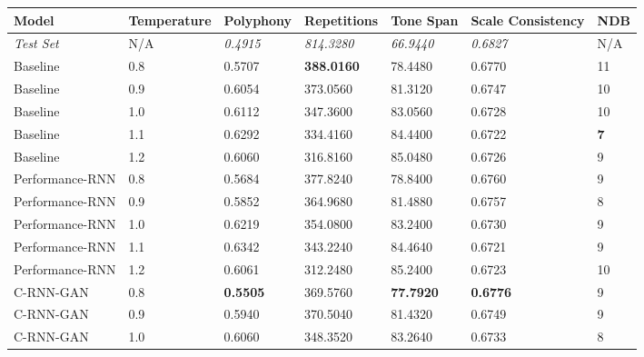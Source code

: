 \documentclass[a4paper]{book}
\begin{document}
\begin{landscape}
\begin{table}[t]
    \centering
\begin{tabular}{l|l|l|l|l|l|l}
    Model             & Temperature & Polyphony       & Repetitions       & Tone Span        & Scale Consistency & NDB     \\ \hline
\textit{Test Set} & N/A         & \textit{0.4915} & \textit{814.3280} & \textit{66.9440} & \textit{0.6827}   & N/A     \\
Baseline          & 0.8         & 0.5707          & \textbf{\color{base0D}388.0160}    & 78.4480          & 0.6770            & 11      \\
Baseline          & 0.9         & 0.6054          & 373.0560          & 81.3120          & 0.6747            & 10      \\
Baseline          & 1.0         & 0.6112          & 347.3600          & 83.0560          & 0.6728            & 10      \\
Baseline          & 1.1         & 0.6292          & 334.4160          & 84.4400          & 0.6722            & \textbf{\color{base0D}7} \\
Baseline          & 1.2         & 0.6060          & 316.8160          & 85.0480          & 0.6726            & 9       \\
Performance-RNN   & 0.8         & 0.5684          & 377.8240          & 78.8400          & 0.6760            & 9       \\
Performance-RNN   & 0.9         & 0.5852          & 364.9680          & 81.4880          & 0.6757            & 8       \\
Performance-RNN   & 1.0         & 0.6219          & 354.0800          & 83.2400          & 0.6730            & 9       \\
Performance-RNN   & 1.1         & 0.6342          & 343.2240          & 84.4640          & 0.6721            & 9       \\
Performance-RNN   & 1.2         & 0.6061          & 312.2480          & 85.2400          & 0.6723            & 10      \\
C-RNN-GAN         & 0.8         & \textbf{\color{base0D}0.5505}    & 369.5760          & \textbf{\color{base0D}77.7920}    & \textbf{\color{base0D}0.6776}      & 9       \\
C-RNN-GAN         & 0.9         & 0.5940          & 370.5040          & 81.4320          & 0.6749            & 9       \\
C-RNN-GAN         & 1.0         & 0.6060          & 348.3520          & 83.2640          & 0.6733            & 8       \\

\end{tabular}
\end{table}
\end{landscape}
\end{document}

